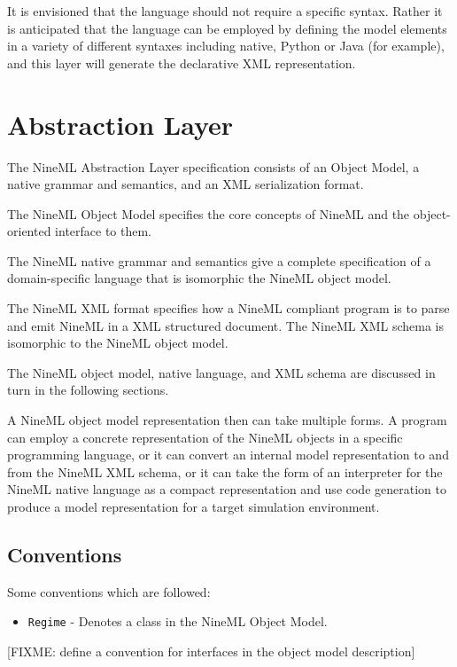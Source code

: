 \documentclass[a4paper]{article}
\newcommand\nmlClass[1]{{\tt #1}}
\begin{document}
It is envisioned that the language should not require a
specific syntax. Rather it is anticipated that the language can be
employed by defining the model elements in a variety of different
syntaxes including native, Python or Java (for example), and this
layer will generate the declarative XML representation.


\section{Abstraction Layer}

The NineML Abstraction Layer specification consists of an Object
Model, a native grammar and semantics, and an XML serialization
format.

The NineML Object Model specifies the core concepts of NineML and the
object-oriented interface to them.

The NineML native grammar and semantics give a complete specification
of a domain-specific language that is isomorphic the NineML object
model.

The NineML XML format specifies how a NineML compliant program is to
parse and emit NineML in a XML structured document.  The NineML XML
schema is isomorphic to the NineML object model.

The NineML object model, native language, and XML schema are discussed
in turn in the following sections.

A NineML object model representation then can take multiple forms.  A
program can employ a concrete representation of the NineML objects in
a specific programming language, or it can convert an internal model
representation to and from the NineML XML schema, or it can take the
form of an interpreter for the NineML native language as a compact
representation and use code generation to produce a model
representation for a target simulation environment.


\subsection{Conventions}

Some conventions which are followed: 

\begin{itemize}
\item \nmlClass{Regime} - Denotes a class in the NineML Object Model.
 
\end{itemize}

[FIXME: define a convention for interfaces in the object model description]
\end{document}
